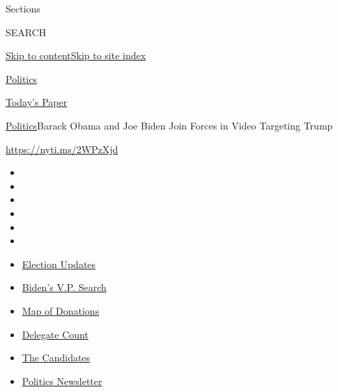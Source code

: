 Sections

SEARCH

\protect\hyperlink{site-content}{Skip to
content}\protect\hyperlink{site-index}{Skip to site index}

\href{https://www.nytimes.com/section/politics}{Politics}

\href{https://myaccount.nytimes.com/auth/login?response_type=cookie\&client_id=vi}{}

\href{https://www.nytimes.com/section/todayspaper}{Today's Paper}

\href{/section/politics}{Politics}\textbar{}Barack Obama and Joe Biden
Join Forces in Video Targeting Trump

\url{https://nyti.ms/2WPzXjd}

\begin{itemize}
\item
\item
\item
\item
\item
\item
\end{itemize}

\begin{itemize}
\item
  \href{https://www.nytimes.com/2020/07/31/us/elections/biden-vs-trump.html?action=click\&pgtype=Article\&state=default\&region=TOP_BANNER\&context=storylines_menu}{Election
  Updates}
\item
  \href{https://www.nytimes.com/article/biden-vice-president-2020.html?action=click\&pgtype=Article\&state=default\&region=TOP_BANNER\&context=storylines_menu}{Biden's
  V.P. Search}
\item
  \href{https://www.nytimes.com/interactive/2020/07/24/us/politics/trump-biden-campaign-donors.html?action=click\&pgtype=Article\&state=default\&region=TOP_BANNER\&context=storylines_menu}{Map
  of Donations}
\item
  \href{https://www.nytimes.com/interactive/2020/us/elections/delegate-count-primary-results.html?action=click\&pgtype=Article\&state=default\&region=TOP_BANNER\&context=storylines_menu}{Delegate
  Count}
\item
  \href{https://www.nytimes.com/interactive/2019/us/politics/2020-presidential-candidates.html?action=click\&pgtype=Article\&state=default\&region=TOP_BANNER\&context=storylines_menu}{The
  Candidates}
\item
  \href{https://www.nytimes.com/newsletters/politics?action=click\&pgtype=Article\&state=default\&region=TOP_BANNER\&context=storylines_menu}{Politics
  Newsletter}
\end{itemize}

